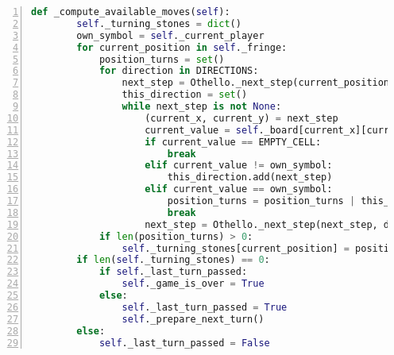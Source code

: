 \begin{lstlisting}[basicstyle=\footnotesize, caption = {Die Funktion \code{\_compute\_available\_moves}}, language = python, captionpos = t , numbers=left, label={lst:fct-compute-available-moves}]
    def _compute_available_moves(self):
        self._turning_stones = dict()
        own_symbol = self._current_player
        for current_position in self._fringe:
            position_turns = set()
            for direction in DIRECTIONS:
                next_step = Othello._next_step(current_position, direction)
                this_direction = set()
                while next_step is not None:
                    (current_x, current_y) = next_step
                    current_value = self._board[current_x][current_y]
                    if current_value == EMPTY_CELL:
                        break
                    elif current_value != own_symbol:
                        this_direction.add(next_step)
                    elif current_value == own_symbol:
                        position_turns = position_turns | this_direction
                        break
                    next_step = Othello._next_step(next_step, direction)
            if len(position_turns) > 0:
                self._turning_stones[current_position] = position_turns
        if len(self._turning_stones) == 0:
            if self._last_turn_passed:
                self._game_is_over = True
            else:
                self._last_turn_passed = True
                self._prepare_next_turn()
        else:
            self._last_turn_passed = False
\end{lstlisting}
